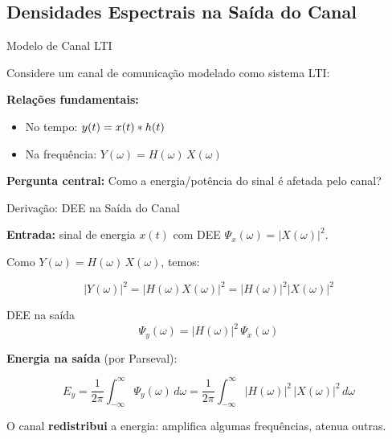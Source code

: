 \subsection{Densidades Espectrais na Saída do Canal}

\begin{frame}{Modelo de Canal LTI}

Considere um canal de comunicação modelado como sistema LTI:

\begin{center}
\end{center}

\textbf{Relações fundamentais:}

\begin{itemize}
\item No tempo: $y(t) = x(t) \ast h(t)$
\item Na frequência: $Y(\omega) = H(\omega)\, X(\omega)$
\end{itemize}

\vspace{0.2cm}

\textbf{Pergunta central:} Como a energia/potência do sinal é afetada pelo canal?

\end{frame}


\begin{frame}{Derivação: DEE na Saída do Canal}

\textbf{Entrada:} sinal de energia $x(t)$ com DEE $\Psi_x(\omega) = |X(\omega)|^2$.

Como $Y(\omega) = H(\omega)\, X(\omega)$, temos:

\[
|Y(\omega)|^2 = |H(\omega) X(\omega)|^2 = |H(\omega)|^2 |X(\omega)|^2
\]

\begin{block}{DEE na saída}
\[
\boxed{\Psi_y(\omega) = |H(\omega)|^2\, \Psi_x(\omega)}
\]
\end{block}

\textbf{Energia na saída} (por Parseval):

\[
E_y = \frac{1}{2\pi} \int_{-\infty}^{\infty} \Psi_y(\omega)\, d\omega = \frac{1}{2\pi} \int_{-\infty}^{\infty} |H(\omega)|^2\, |X(\omega)|^2\, d\omega
\]

O canal \textbf{redistribui} a energia: amplifica algumas frequências, atenua outras.

\end{frame}

